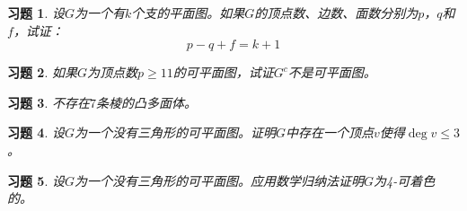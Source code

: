\documentclass{article}
\begin{document}
\begin{CJK}{UTF8}{gbsn}
\newtheorem{Exercise}{习题}
\begin{Exercise}
    设$G$为一个有$k$个支的平面图。如果$G$的顶点数、边数、面数分别为$p$，$q$和$f$，试证：
  \[p-q+f=k+1\]
\end{Exercise}
\begin{Exercise}
    如果$G$为顶点数$p\geq 11$的可平面图，试证$G^c$不是可平面图。
\end{Exercise}
\begin{Exercise}
    不存在$7$条棱的凸多面体。
\end{Exercise}
\begin{Exercise}
    设$G$为一个没有三角形的可平面图。证明$G$中存在一个顶点$v$使得$\deg v \leq 3$。
\end{Exercise}
\begin{Exercise}
    设$G$为一个没有三角形的可平面图。应用数学归纳法证明$G$为4-可着色的。
\end{Exercise}
\end{CJK}
\end{document}
